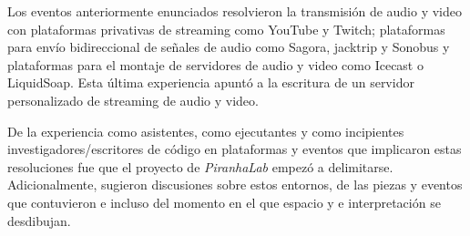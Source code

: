 Los eventos anteriormente enunciados resolvieron la transmisión de audio y video con plataformas privativas de streaming como YouTube y Twitch; plataformas para envío bidireccional de señales de audio como Sagora, jacktrip y Sonobus y plataformas para el montaje de servidores de audio y video como Icecast o LiquidSoap. Esta última experiencia apuntó a la escritura de un servidor personalizado de streaming de audio y video. %

De la experiencia como asistentes, como ejecutantes y como incipientes investigadores/escritores de código en plataformas y eventos que implicaron estas resoluciones fue que el proyecto de \textit{PiranhaLab} empezó a delimitarse. Adicionalmente, sugieron discusiones sobre estos entornos, de las piezas y eventos que contuvieron e incluso del momento en el que espacio y e interpretación se desdibujan. 
